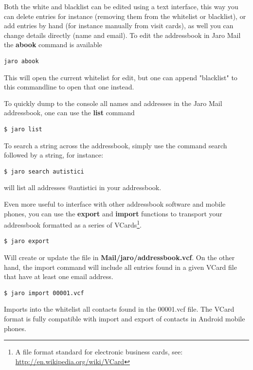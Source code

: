 \documentclass[a4,onecolumn,portrait]{article}
\begin{document}
Both the white and blacklist can be edited using a text interface,
this way you can delete entries for instance (removing them from the
whitelist or blacklist), or add entries by hand (for instance manually
from visit cards), as well you can change details directly (name and
email). To edit the addressbook in Jaro Mail the \textbf{abook} command is
available

\begin{verbatim}
jaro abook
\end{verbatim}

This will open the current whitelist for edit, but one can append
"blacklist" to this commandline to open that one instead.

To quickly dump to the console all names and addresses in the Jaro
Mail addressbook, one can use the \textbf{list} command

\begin{verbatim}
$ jaro list
\end{verbatim}

To search a string across the addressbook, simply use the command
search followed by a string, for instance:

\begin{verbatim}
$ jaro search autistici
\end{verbatim}

will list all addresses @autistici in your addressbook.

Even more useful to interface with other addressbook
software and mobile phones, you can use the \textbf{export} and \textbf{import}
functions to transport your addressbook formatted as a series of
VCards\footnote{A file format standard for electronic business cards, see: \url{http://en.wikipedia.org/wiki/VCard}}.

\begin{verbatim}
$ jaro export
\end{verbatim}

Will create or update the file in \textbf{Mail/jaro/addressbook.vcf}. On the
other hand, the import command will include all entries found in a
given VCard file that have at least one email address.

\begin{verbatim}
$ jaro import 00001.vcf
\end{verbatim}

Imports into the whitelist all contacts found in the 00001.vcf file.
The VCard format is fully compatible with import and export of
contacts in Android mobile phones.
\end{document}

